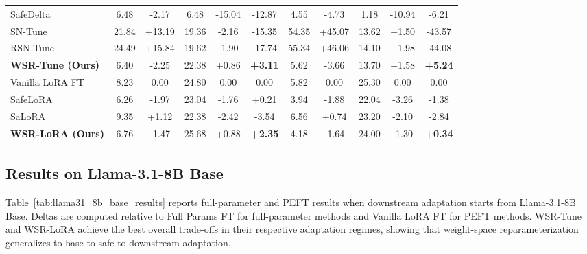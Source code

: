 \documentclass{article}
\begin{document}
\begin{table}[htbp]
{\begin{tabular}{lccccc|ccccc}
SafeDelta
& 6.48 &  -2.17 & 6.48 & -15.04 & -12.87
& 4.55 &  -4.73 & 1.18 & -10.94 & -6.21 \\

SN-Tune
& 21.84 & +13.19 & 19.36 & -2.16 & -15.35
& 54.35 & +45.07 & 13.62 & +1.50 & -43.57 \\

RSN-Tune
& 24.49 & +15.84 & 19.62 & -1.90 & -17.74
& 55.34 & +46.06 & 14.10 & +1.98 & -44.08 \\

\textbf{WSR-Tune (Ours)}
& 6.40 &  -2.25  & 22.38 &  +0.86  & \cellcolor{green!20}\textbf{+3.11}
& 5.62 &  -3.66 & 13.70 & +1.58 & \cellcolor{green!20}\textbf{+5.24} \\

\midrule

Vanilla LoRA FT
& 8.23 & 0.00 & 24.80 & 0.00 & 0.00
& 5.82 & 0.00 & 25.30 & 0.00 & 0.00 \\

SafeLoRA
& 6.26 & -1.97 & 23.04 & -1.76 & +0.21
& 3.94 & -1.88 & 22.04 & -3.26 & -1.38 \\

SaLoRA
& 9.35 & +1.12 & 22.38 & -2.42 & -3.54
& 6.56 & +0.74 & 23.20 & -2.10 & -2.84 \\

\textbf{WSR-LoRA (Ours)}
& 6.76 & -1.47 & 25.68 & +0.88 & \cellcolor{green!20}\textbf{+2.35}
& 4.18 & -1.64 & 24.00 & -1.30 & \cellcolor{green!20}\textbf{+0.34} \\

\bottomrule
\end{tabular}
}
\end{table}







\subsection{Results on Llama-3.1-8B Base}
\label{app:base_model_results}

Table~\ref{tab:llama31_8b_base_results} reports full-parameter and PEFT results when downstream adaptation starts from Llama-3.1-8B Base. Deltas are computed relative to Full Params FT for full-parameter methods and Vanilla LoRA FT for PEFT methods. WSR-Tune and WSR-LoRA achieve the best overall trade-offs in their respective adaptation regimes, showing that weight-space reparameterization generalizes to base-to-safe-to-downstream adaptation.
\end{document}
